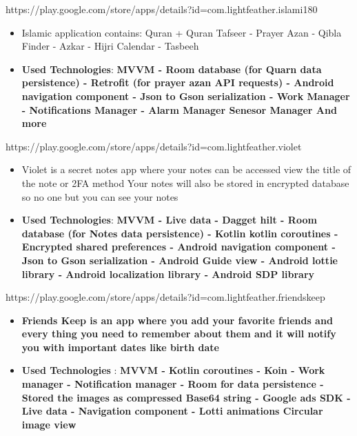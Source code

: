 \documentclass[10pt,a4paper,ragged2e,withhyper]{altacv}
\begin{document}
    \begin{paracol}{1}

        {\cvrepo{|\faLock\faAndroid}
        {https://play.google.com/store/apps/details?id=com.lightfeather.islami180}}{}{}
        \begin{itemize}
            \item \textbf{}Islamic application contains:
            Quran + Quran Tafseer - Prayer Azan - Qibla Finder - Azkar - Hijri Calendar - Tasbeeh
            \item \textbf{Used Technologies}: \textbf{MVVM -
            Room database (for Quarn data persistence) -
            Retrofit (for prayer azan API requests) -
            Android navigation component -
            Json to Gson serialization -
            Work Manager -
            Notifications Manager -
            Alarm Manager
            Senesor Manager And more
            }
        \end{itemize}
        \divider

        {\cvrepo{|\faGithub\faAndroid}
        {https://play.google.com/store/apps/details?id=com.lightfeather.violet}}{}{}
        \begin{itemize}
            \item Violet is a secret notes app where your notes can be accessed view the title of the note or 2FA method Your notes will also be stored in encrypted database so no one but you can see your notes
            \item \textbf{Used Technologies}: \textbf{MVVM -
            Live data -
            Dagget hilt -
            Room database (for Notes data persistence) -
            Kotlin kotlin coroutines -
            Encrypted shared preferences -
            Android navigation component -
            Json to Gson serialization -
            Android Guide view -
            Android lottie library -
            Android localization library -
            Android SDP library}
        \end{itemize}
        \divider

        {\cvrepo{|\faGithub\faAndroid}
        {https://play.google.com/store/apps/details?id=com.lightfeather.friendskeep}}{}{}
        \begin{itemize}
            \item \textbf{Friends Keep is an app where you add your favorite friends and every thing you need to remember about them and it will notify you with important dates like birth date}
            \item \textbf{Used Technologies} : \textbf{MVVM -
            Kotlin coroutines -
            Koin -
                Work manager -
                Notification manager -
                Room for data persistence -
                Stored the images as compressed Base64 string -
                Google ads SDK -
                Live data -
                Navigation component -
                 Lotti animations
                Circular image view}
        \end{itemize}
        \divider
        

\end{paracol}
\end{document}
